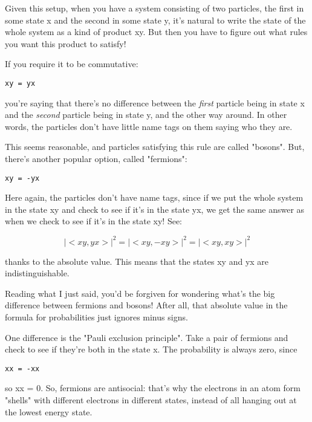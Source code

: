 Given this setup, when you have a system consisting of two particles, the 
first in some state x and the second in some state y, it's natural to 
write the state of the whole system as a kind of product xy.  But 
then you have to figure out what rules you want this product to satisfy!

If you require it to be commutative:

\begin{verbatim}
xy = yx
\end{verbatim}
    

you're saying that there's no difference between the \emph{first} particle
being in state x and the \emph{second} particle being in state y, and the
other way around.  In other words, the particles don't have little
name tags on them saying who they are. 

This seems reasonable, and particles satisfying this rule are called
"bosons".  But, there's another popular option, 
called "fermions":

\begin{verbatim}
xy = -yx
\end{verbatim}
    
Here again, the particles don't have name tags, since if we put
the whole system in the state xy and check to see if it's in the
state yx, we get the same answer as when we check to see if it's
in the state xy!  See:

$$
|<xy,yx>|^{2} = |<xy,-xy>|^{2}

           = |<xy,xy>|^{2}
$$
    
thanks to the absolute value.  This means that the states xy and
yx are indistinguishable.   

Reading what I just said, you'd be forgiven for wondering what's the 
big difference between fermions and bosons!  After all, that absolute 
value in the formula for probabilities just ignores minus signs.

One difference is the "Pauli exclusion principle".  Take a pair of
fermions and check to see if they're both in the state x.  The 
probability is always zero, since

\begin{verbatim}
xx = -xx  
\end{verbatim}
    
so xx = 0.   So, fermions are antisocial: that's why the electrons
in an atom form "shells" with different electrons in different states,
instead of all hanging out at the lowest energy state. 

